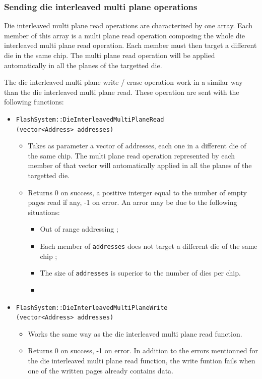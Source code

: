 \subsubsection{Sending die interleaved multi plane operations}
Die interleaved multi plane read operations are characterized by one array. Each member of this array is a multi plane read operation composing the whole die interleaved multi plane read operation. Each member must then target a different die in the same chip. The multi plane read operation will be applied automatically in all the planes of the targetted die.

The die interleaved multi plane write / erase operation work in a similar way than the die interleaved multi plane read. These operation are sent with the following functions:

\begin{itemize}
  \item \verb+FlashSystem::DieInterleavedMultiPlaneRead+\\\verb+(vector<Address> addresses)+
  \begin{itemize}
    \item Takes as parameter a vector of addresses, each one in a different die of the same chip. The multi plane read operation represented by each member of that vector will automatically applied in all the planes of the targetted die.
    \item Returns 0 on success, a positive interger equal to the number of empty pages read if any, -1 on error. An arror may be due to the following situations:
    \begin{itemize}
      \item Out of range addressing ;
      \item Each member of \verb+addresses+ does not target a different die of the same chip ;
      \item The size of \verb+addresses+ is superior to the number of dies per chip.
      \item 
    \end{itemize} 
  \end{itemize}
  
  \item \verb+FlashSystem::DieInterleavedMultiPlaneWrite+\\\verb+(vector<Address> addresses)+
  \begin{itemize}
    \item Works the same way as the die interleaved multi plane read function.
    \item Returns 0 on success, -1 on error. In addition to the errors mentionned for the die interleaved multi plane read function, the write funtion fails when one of the written pages already contains data.
  \end{itemize}
  

\end{itemize}
